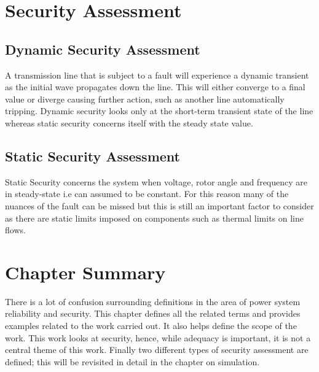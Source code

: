 \documentclass[a4paper,oneside,12pt]{report}
\begin{document}
\section{Security Assessment}

\subsection{Dynamic Security Assessment}

A transmission line that is subject to a fault will experience a dynamic transient as the initial wave propagates down the line. This will either converge to a final value or diverge causing further action, such as another line automatically tripping. Dynamic security looks only at the short-term  transient state of the line whereas static security concerns itself with the steady state value.

\subsection{Static Security Assessment}

Static Security concerns the system when voltage, rotor angle and frequency are in steady-state i.e can assumed to be constant. For this reason many of the nuances of the fault can be missed but this is still an important factor to consider as there are static limits imposed on components such as thermal limits on line flows.

\section{Chapter Summary}

There is a lot of confusion surrounding definitions in the area of power system reliability and security. This chapter defines all the related terms and provides examples related to the work carried out. It also helps define the scope of the work. This work looks at security, hence, while adequacy is important, it is not a central theme of this work. Finally two different types of security assessment are defined; this will be revisited in detail in the chapter on simulation.











\end{document}
